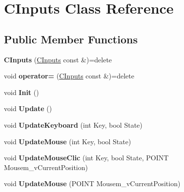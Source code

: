 \hypertarget{class_c_inputs}{}\section{C\+Inputs Class Reference}
\label{class_c_inputs}
\subsection*{Public Member Functions}
\begin{DoxyCompactItemize}
\item 
{\bfseries C\+Inputs} (\hyperlink{class_c_inputs}{C\+Inputs} const \&)=delete\hypertarget{class_c_inputs_a659c0296a9fa7cf83b5f12aa4a7b4ca5}{}\label{class_c_inputs_a659c0296a9fa7cf83b5f12aa4a7b4ca5}

\item 
void {\bfseries operator=} (\hyperlink{class_c_inputs}{C\+Inputs} const \&)=delete\hypertarget{class_c_inputs_aeeb9489896804e732133e416e023bf5e}{}\label{class_c_inputs_aeeb9489896804e732133e416e023bf5e}

\item 
void {\bfseries Init} ()\hypertarget{class_c_inputs_a82502b400d9ef5b152386dfe8cda1af5}{}\label{class_c_inputs_a82502b400d9ef5b152386dfe8cda1af5}

\item 
void {\bfseries Update} ()\hypertarget{class_c_inputs_aab229a334906764ded479dfd40f9ce1a}{}\label{class_c_inputs_aab229a334906764ded479dfd40f9ce1a}

\item 
void {\bfseries Update\+Keyboard} (int Key, bool State)\hypertarget{class_c_inputs_a65d3830789f95bd08aa66ff2c9b01124}{}\label{class_c_inputs_a65d3830789f95bd08aa66ff2c9b01124}

\item 
void {\bfseries Update\+Mouse} (int Key, bool State)\hypertarget{class_c_inputs_ad3ffe707683087330c85db4491105930}{}\label{class_c_inputs_ad3ffe707683087330c85db4491105930}

\item 
void {\bfseries Update\+Mouse\+Clic} (int Key, bool State, P\+O\+I\+NT Mousem\+\_\+v\+Current\+Position)\hypertarget{class_c_inputs_ae5986116d4532e8cf2dcfebad7633dea}{}\label{class_c_inputs_ae5986116d4532e8cf2dcfebad7633dea}

\item 
void {\bfseries Update\+Mouse} (P\+O\+I\+NT Mousem\+\_\+v\+Current\+Position)\hypertarget{class_c_inputs_a19a53d6e2b4b2d52836e9581ea1740a1}{}\label{class_c_inputs_a19a53d6e2b4b2d52836e9581ea1740a1}

\end{DoxyCompactItemize}
